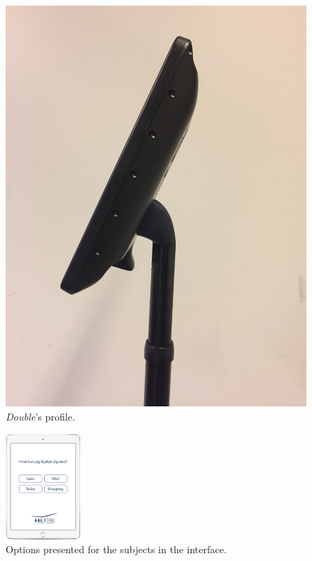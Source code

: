 \begin{figure}[H]
\begin{minipage}{.25\textwidth}
  \includegraphics[width=\linewidth, angle =-90]{Figure/ModificeretDoubleSideClose}
  \caption{\textit{Double}'s profile.}
  \label{fig:ModificeretDoubleSideClose}
\end{minipage}
\end{figure}
\noindent
%
%
\begin{figure}[H]
\centering
\includegraphics[width = 0.25\textwidth]{Figure/brug}
\caption{Options presented for the subjects in the interface.}
\label{fig:brug}
\end{figure}
\noindent
% 

